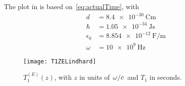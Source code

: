 \documentclass[11pt]{article}
\begin{document}
	The plot in  is based on~\eqref{eq:actualTime}, with
	\begin{align}
		d &= \SI{8.4e-30}{\coulomb \meter} \\
		\hbar &= \SI{1.05e-34}{\J \s} \\
		\epsilon_0 &= \SI{8.854e-12}{\farad\per\meter} \\
		\omega &= \SI{10e9}{\Hz}
	\end{align}
	\begin{figure}[htp]
		\centering
		\texttt{[image: T1ZELindhard]}
		\caption{$T_{1}^{(E)}(z)$, with $z$ in units of $\flatfrac{\omega}{c}$ and $T_1$ in seconds.}\label{fig:t1ez}
	\end{figure}

	\newpage
	\listoftodos
	\newpage
	\printbibliography
\end{document}
